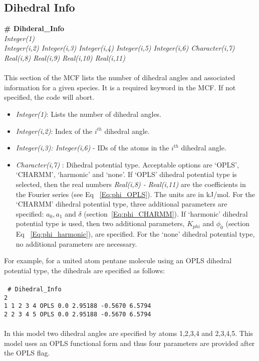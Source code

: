 \subsection{Dihedral Info}\label{sec:Get_Dihedral_Info}
%
{\bf \# Dihderal\_Info} \\
%
{\it Integer(1)} \\
%
{\it Integer(i,2) Integer(i,3) Integer(i,4) Integer(i,5) Integer(i,6)
  Character(i,7) Real(i,8) Real(i,9) Real(i,10) Real(i,11)} \\ \\
%
This section of the MCF lists the number of dihedral angles and
associated information for a given species. It is a required keyword in the MCF.
If not specified, the code
will abort.

\begin{itemize}
%
\item {\it Integer(1)}: Lists the number of dihedral angles.
%
\item {\it Integer(i,2)}: Index of the $i^{th}$ dihedral angle.
%
\item {\it Integer(i,3): Integer(i,6)} - IDs of the atoms in the $i^{th}$
dihedral angle.
%
\item {\it Character(i,7) }: Dihedral potential type. Acceptable options
are `OPLS', `CHARMM', `harmonic' and `none'. If `OPLS' dihedral
potential type is selected, then the real numbers {\it Real(i,8) -
  Real(i,11)} are the coefficients in the Fourier series
(see Eq ~\ref{Eq:phi_OPLS}). The units are in kJ/mol. For the `CHARMM'
dihedral potential type, three additional parameters are specified:
$a_0, a_1$ and $\delta$ (section~\ref{Eq:phi_CHARMM}).  If `harmonic' dihedral
potential type is used, then two additional parameters, $K_{phi}$ and
$\phi_0$ (section Eq ~\ref{Eq:phi_harmonic}), are specified.  For the `none' dihedral potential
type, no additional parameters are necessary.

\end{itemize}
%
For example, for a united atom pentane molecule using an OPLS dihedral potential type,
the dihedrals are specified as follows:\\ \\
%
\texttt{
\# Dihedral\_Info\\
2\\
1    1    2    3    4    OPLS     0.0     2.95188     -0.5670     6.5794\\
2    2    3    4    5    OPLS     0.0     2.95188     -0.5670     6.5794\\
}\\
%
In this model two dihedral angles are specified by atoms 1,2,3,4 and 2,3,4,5.
This model uses an OPLS functional form and thus four parameters are provided
after the OPLS flag.
%
